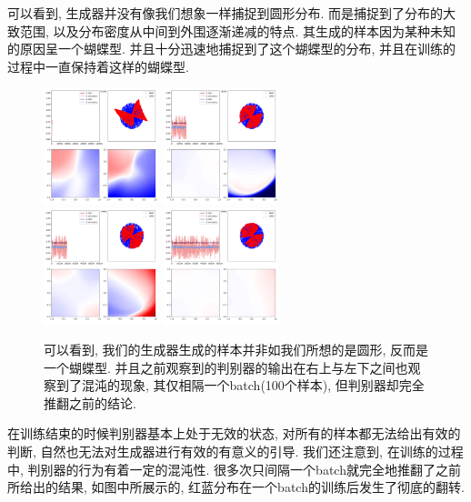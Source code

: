 \documentclass[lang=cn,11pt]{elegantpaper}
\begin{document}
可以看到, 生成器并没有像我们想象一样捕捉到圆形分布. 而是捕捉到了分布的大致范围, 以及分布密度从中间到外围逐渐递减的特点. 其生成的样本因为某种未知的原因呈一个蝴蝶型. 并且十分迅速地捕捉到了这个蝴蝶型的分布, 并且在训练的过程中一直保持着这样的蝴蝶型. 
\begin{figure}[hbp]
  \centering
  \includegraphics[width=0.3\textwidth]{circle_2_1}
  \includegraphics[width=0.3\textwidth]{circle_2_2}\\
  \includegraphics[width=0.3\textwidth]{circle_2_3}
  \includegraphics[width=0.3\textwidth]{circle_2_4}
  \caption{\scriptsize 可以看到, 我们的生成器生成的样本并非如我们所想的是圆形, 反而是一个蝴蝶型. 并且之前观察到的判别器的输出在右上与左下之间也观察到了混沌的现象, 其仅相隔一个batch(100个样本), 但判别器却完全推翻之前的结论.}
\end{figure}

在训练结束的时候判别器基本上处于无效的状态, 对所有的样本都无法给出有效的判断, 自然也无法对生成器进行有效的有意义的引导. 我们还注意到, 在训练的过程中, 判别器的行为有着一定的混沌性. 很多次只间隔一个batch就完全地推翻了之前所给出的结果, 如图中所展示的, 红蓝分布在一个batch的训练后发生了彻底的翻转. 
\end{document}
